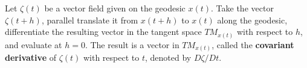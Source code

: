 Let $\zeta(t)$ be a vector field given on the geodesic $x(t)$. Take the vector $\zeta(t + h)$, parallel translate it from $x(t + h)$ to $x(t)$ along the geodesic, differentiate the resulting vector in the tangent space $TM_{x(t)}$ with respect to $h$, and evaluate at $h = 0$. The result is a vector in $TM_{x(t)}$, called the \textbf{covariant derivative} of $\zeta(t)$ with respect to $t$, denoted by $D\zeta/Dt$.
